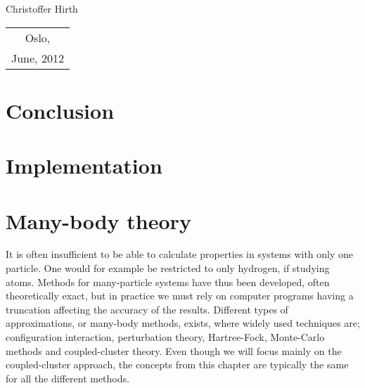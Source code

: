\begin{flushright}
Christoffer Hirth
\end{flushright}

\begin{tabular}{c}
Oslo,\\
June, 2012
\end{tabular}



\chapter{Conclusion}\chapter{Implementation}\chapter{Many-body theory}
It is often insufficient to be able to calculate properties in systems with only one particle.
One would for example be restricted to only hydrogen, if studying atoms.
Methods for many-particle systems have thus been developed, often theoretically exact, but in practice we must rely on computer programs having a truncation affecting the accuracy of the results.
Different types of approximations, or many-body methods, exists, where widely
used techniques are; configuration interaction, perturbation theory, Hartree-Fock, Monte-Carlo methods and coupled-cluster theory.
Even though we will focus mainly on the coupled-cluster approach, the concepts from this chapter are typically the same for all the different methods.


